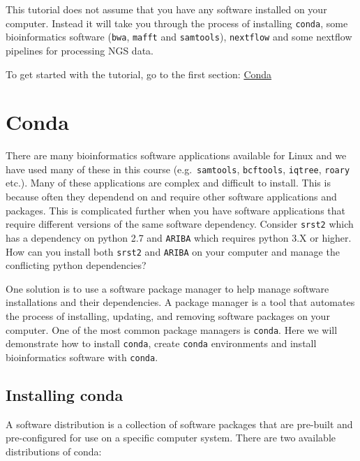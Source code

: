 \documentclass[11pt]{article}
\begin{document}
This tutorial does not assume that you have any software installed on
your computer. Instead it will take you through the process of
installing \texttt{conda}, some bioinformatics software (\texttt{bwa},
\texttt{mafft} and \texttt{samtools}), \texttt{nextflow} and some
nextflow pipelines for processing NGS data.

    To get started with the tutorial, go to the first section:
\href{conda.ipynb}{Conda}





\newpage





    \hypertarget{conda}{%
\section{Conda}\label{conda}}

There are many bioinformatics software applications available for Linux
and we have used many of these in this course (e.g.~\texttt{samtools},
\texttt{bcftools}, \texttt{iqtree}, \texttt{roary} etc.). Many of these
applications are complex and difficult to install. This is because often
they dependend on and require other software applications and packages.
This is complicated further when you have software applications that
require different versions of the same software dependency. Consider
\texttt{srst2} which has a dependency on python 2.7 and \texttt{ARIBA}
which requires python 3.X or higher. How can you install both
\texttt{srst2} and \texttt{ARIBA} on your computer and manage the
conflicting python dependencies?

One solution is to use a software package manager to help manage
software installations and their dependencies. A package manager is a
tool that automates the process of installing, updating, and removing
software packages on your computer. One of the most common package
managers is \texttt{conda}. Here we will demonstrate how to install
\texttt{conda}, create \texttt{conda} environments and install
bioinformatics software with \texttt{conda}.

    \hypertarget{installing-conda}{%
\subsection{Installing conda}\label{installing-conda}}

A software distribution is a collection of software packages that are
pre-built and pre-configured for use on a specific computer system.
There are two available distributions of conda:
\end{document}
